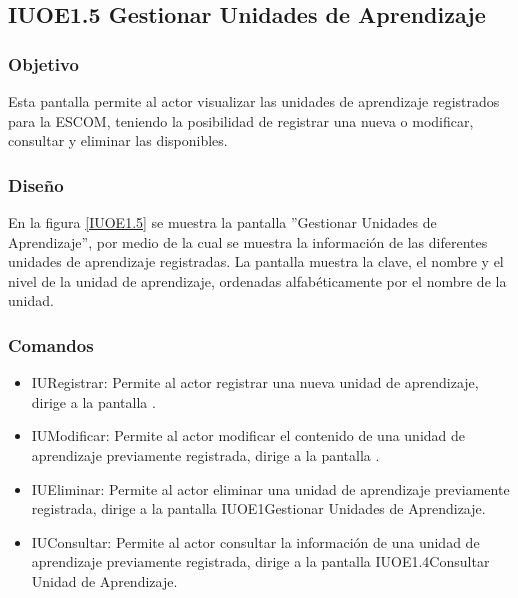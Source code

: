 \subsection{IUOE1.5 Gestionar Unidades de Aprendizaje}

\subsubsection{Objetivo}
	
	Esta pantalla permite al actor visualizar las unidades de aprendizaje registrados para la ESCOM, teniendo la posibilidad de registrar una nueva o modificar, consultar y eliminar las disponibles.

\subsubsection{Diseño}

    En la figura \ref{IUOE1.5} se muestra la pantalla ''Gestionar Unidades de Aprendizaje'', por medio de la cual se muestra la información de las diferentes unidades de aprendizaje registradas. La pantalla muestra la clave, el nombre y el nivel de la unidad de aprendizaje, ordenadas alfabéticamente por el nombre de la unidad.
 

\subsubsection{Comandos}
    \begin{itemize}
	\item IURegistrar: Permite al actor registrar una nueva unidad de aprendizaje, dirige a la pantalla .
	
	\item IUModificar: Permite al actor modificar el contenido de una unidad de aprendizaje previamente registrada, dirige a la pantalla .
	
	\item IUEliminar: Permite al actor eliminar una unidad de aprendizaje previamente registrada, dirige a la pantalla {IUOE1}{Gestionar Unidades de Aprendizaje}.
	
	\item IUConsultar: Permite al actor consultar la información de una unidad de aprendizaje previamente registrada, dirige a la pantalla {IUOE1.4}{Consultar Unidad de Aprendizaje}.
    \end{itemize}
